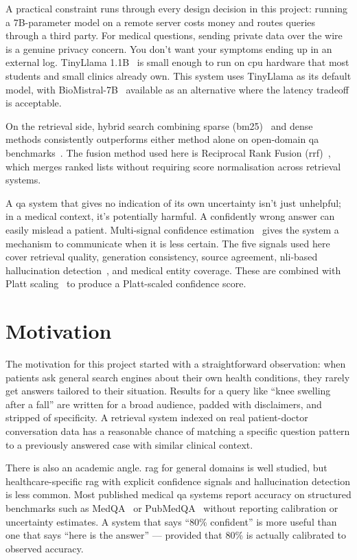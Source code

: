 A practical constraint runs through every design decision in this project: running a 7B-parameter model on a remote server costs money and routes queries through a third party. For medical questions, sending private data over the wire is a genuine privacy concern. You don't want your symptoms ending up in an external log. TinyLlama 1.1B~\cite{zhang2024tinyllama} is small enough to run on \ac{cpu} hardware that most students and small clinics already own. This system uses TinyLlama as its default model, with BioMistral-7B~\cite{labrak2024biomistral} available as an alternative where the latency tradeoff is acceptable.

On the retrieval side, hybrid search combining sparse (\ac{bm25})~\cite{robertson2009bm25} and dense~\cite{reimers2019sbert} methods consistently outperforms either method alone on open-domain \ac{qa} benchmarks~\cite{ma2022hybrid}. The fusion method used here is Reciprocal Rank Fusion (\ac{rrf})~\cite{cormack2009rrf}, which merges ranked lists without requiring score normalisation across retrieval systems.

A \ac{qa} system that gives no indication of its own uncertainty isn't just unhelpful; in a medical context, it's potentially harmful. A confidently wrong answer can easily mislead a patient. Multi-signal confidence estimation~\cite{guo2017calibration} gives the system a mechanism to communicate when it is less certain. The five signals used here cover retrieval quality, generation consistency, source agreement, \ac{nli}-based hallucination detection~\cite{he2021deberta}, and medical entity coverage. These are combined with Platt scaling~\cite{platt1999probabilistic} to produce a Platt-scaled confidence score.

\section{Motivation}

The motivation for this project started with a straightforward observation: when patients ask general search engines about their own health conditions, they rarely get answers tailored to their situation. Results for a query like ``knee swelling after a fall'' are written for a broad audience, padded with disclaimers, and stripped of specificity. A retrieval system indexed on real patient-doctor conversation data has a reasonable chance of matching a specific question pattern to a previously answered case with similar clinical context.

There is also an academic angle. \ac{rag} for general domains is well studied, but healthcare-specific \ac{rag} with explicit confidence signals and hallucination detection is less common. Most published medical \ac{qa} systems report accuracy on structured benchmarks such as MedQA~\cite{jin2021medqa} \allowbreak{}or PubMedQA~\cite{jin2019pubmedqa} without reporting calibration or uncertainty estimates. A system that says ``80\% confident'' is more useful than one that says ``here is the answer'' --- provided that 80\% is actually calibrated to observed accuracy.

